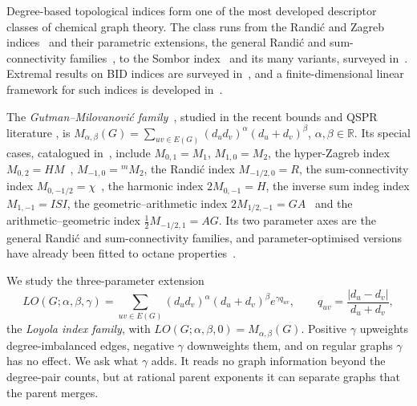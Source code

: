 \documentclass[a5paper, 10pt]{article}
\theoremstyle{plain}
\theoremstyle{remark}
\theoremstyle{definition}
\begin{document}
  Degree-based topological indices form one of the most developed
  descriptor classes of chemical graph theory. The class runs from the
  Randi\'c and Zagreb indices~\cite{Randic1975, GutmanTrinajstic1972}
  and their parametric extensions, the general Randi\'c and
  sum-connectivity families~\cite{BollobasErdos1998, ZhouTrinajstic2010},
  to the Sombor index~\cite{Gutman2021Sombor} and its many variants, surveyed in~\cite{Gutman2026SomborSurvey}. Extremal results on
  BID indices are surveyed
  in~\cite{AliGutmanFurtula2026BID}, and a finite-dimensional linear
  framework for such indices is developed in~\cite{Rada2026LinearVDB}.

  The \emph{Gutman--Milovanovi\'c family}~\cite{GutmanMilovanovic2020AKCE},
  studied in the recent bounds and QSPR literature
  \cite{GranadosJMC2025GM, MolinaSigarreta2025GM, PortillaJMC2025GM},
  is $M_{\alpha,\beta}(G) = \sum_{uv \in E(G)}
  (d_u d_v)^{\alpha} (d_u + d_v)^{\beta}$, $\alpha, \beta \in
  \mathbb{R}$. Its special cases, catalogued
  in~\cite{MolinaSigarreta2025GM}, include $M_{0,1} = M_1$,
  $M_{1,0} = M_2$, the hyper-Zagreb index
  $M_{0,2} = HM$~\cite{ShirdelRezapourSayadi2013HM},
  $M_{-1,0} = {}^{m}\!M_2$, the Randi\'c index $M_{-1/2,0} = R$,
  the sum-connectivity index
  $M_{0,-1/2} = \chi$~\cite{ZhouTrinajstic2009sumconn}, the harmonic
  index $2M_{0,-1} = H$, the inverse sum indeg index $M_{1,-1} = ISI$,
  the geometric--arithmetic index
  $2M_{1/2,-1} = GA$~\cite{VukicevicFurtula2009GA} and the
  arithmetic--geometric index $\tfrac12 M_{-1/2,1} = AG$. Its two
  parameter axes are the general Randi\'c and sum-connectivity
  families, and parameter-optimised versions have already been fitted
  to octane properties~\cite{AliGutmanFurtulaAlbalahiHamza2025}.

  We study the three-parameter extension
  \[
  LO(G;\alpha,\beta,\gamma) = \sum_{uv \in E(G)}
  (d_u d_v)^{\alpha}(d_u+d_v)^{\beta} e^{\gamma q_{uv}},
  \qquad q_{uv} = \frac{|d_u - d_v|}{d_u + d_v},
  \]
  the \emph{Loyola index family}, with $LO(G;\alpha,\beta,0) =
  M_{\alpha,\beta}(G)$. Positive $\gamma$ upweights degree-imbalanced
  edges, negative $\gamma$ downweights them, and on regular graphs
  $\gamma$ has no effect. We ask what $\gamma$ adds. It reads no graph information beyond the degree-pair counts, but at rational parent exponents it can separate graphs that the parent merges.
\end{document}
